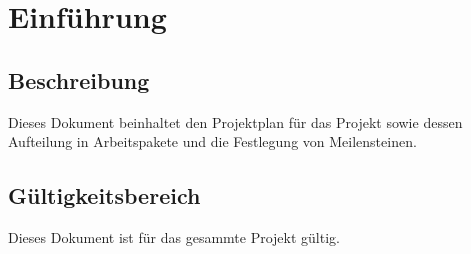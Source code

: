 \chapter{Einführung}

\section{Beschreibung}
Dieses Dokument beinhaltet den Projektplan für das Projekt \project sowie dessen Aufteilung in Arbeitspakete und die Festlegung von Meilensteinen.

\section{Gültigkeitsbereich}
Dieses Dokument ist für das gesammte Projekt \project gültig.
